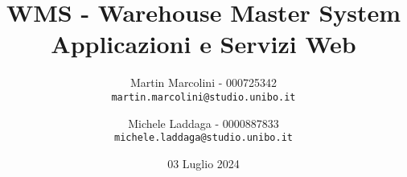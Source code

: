 
\begin{titlepage}
    \title{\LARGE WMS - Warehouse Master System \\[10pt] \large Applicazioni e Servizi Web}
    \author{
        Martin Marcolini - 000725342 \\ \texttt{martin.marcolini@studio.unibo.it} \\[10pt]
        \and
        Michele Laddaga - 0000887833 \\ \texttt{michele.laddaga@studio.unibo.it}
    }
    \date{03 Luglio 2024}
    \maketitle
\end{titlepage}
